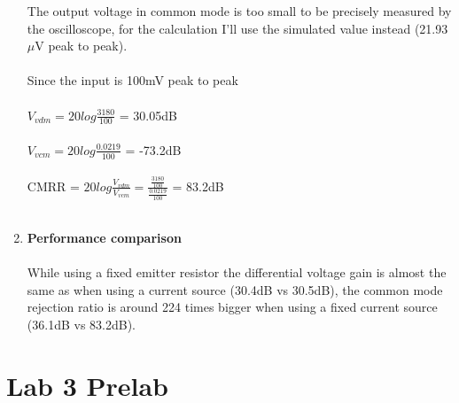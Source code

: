 \documentclass{article}
\begin{document}
\begin{enumerate}
		The output voltage in common mode is too small to be precisely measured by the oscilloscope, for the calculation I'll use the simulated value instead (21.93\(\mu\)V peak to peak).\\\\
		Since the input is 100mV peak to peak\\\\ \(V_{vdm} = 20 log\frac{3180}{100}\) = 30.05dB\\\\
		\(V_{vcm} = 20 log\frac{0.0219}{100}\) = -73.2dB\\\\
		CMRR = \(20log \frac{V_{vdm}}{V_{vcm}} = \frac{\frac{3180}{100}}{\frac{0.0219}{100}} \) = 83.2dB\\\\
		\item  \textbf{Performance comparison}\\\\
		While using a fixed emitter resistor the differential voltage gain is almost the same as when using a current source (30.4dB vs 30.5dB), the common mode rejection ratio is around 224 times bigger when using a fixed current source (36.1dB vs 83.2dB).   
		
	\end{enumerate}
	
	\section{Lab 3 Prelab }
\end{document}
